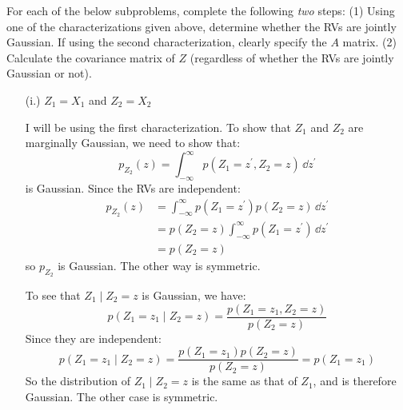 \documentclass{article}
\begin{document}
\begin{itemize}
        For each of the below subproblems, complete the following \textit{two} steps: (1) Using one of the characterizations given above, determine whether the RVs are jointly Gaussian. If using the second characterization, clearly specify the $A$ matrix. (2) Calculate the covariance matrix of $Z$ (regardless of whether the RVs are jointly Gaussian or not).
            \begin{itemize}
                \item [(i.)] $Z_{1} = X_{1}$ and $Z_{2} = X_{2}$
                    \begin{answer}
                        I will be using the first characterization. To show that $Z_{1}$ and $Z_{2}$ are marginally Gaussian, we need to show that:
                            \begin{equation*}
                                p_{Z_{2}}(z) = \int_{-\infty}^{\infty} p(Z_{1} = z^{\prime}, Z_{2} = z) \, \dd{z^{\prime}}
                            \end{equation*}
                        is Gaussian. Since the RVs are independent:
                            \begin{align*}
                                p_{Z_{2}}(z) &= \int_{-\infty}^{\infty} p(Z_{1} = z^{\prime})p(Z_{2} = z) \, \dd{z^{\prime}}  \\
                                             &= p(Z_{2} = z) \int_{-\infty}^{\infty} p(Z_{1} = z^{\prime}) \, \dd{z^{\prime}} \\
                                             &= p(Z_{2} = z)                                                                    
                            \end{align*}
                        so $p_{Z_{2}}$ is Gaussian. The other way is symmetric.

                        To see that $Z_{1} \mid Z_{2} = z$ is Gaussian, we have:
                            \begin{equation*}
                                p(Z_{1} = z_{1} \mid Z_{2} = z) = \dfrac{p(Z_{1} = z_{1}, Z_{2} = z)}{p(Z_{2} = z)}
                            \end{equation*}
                        Since they are independent:
                            \begin{equation*}
                                p(Z_{1} = z_{1} \mid Z_{2} = z) = \dfrac{p(Z_{1} = z_{1})p(Z_{2} = z)}{p(Z_{2} = z)} = p(Z_{1} = z_{1})
                            \end{equation*}
                        So the distribution of $Z_{1} \mid Z_{2} = z$ is the same as that of $Z_{1}$, and is therefore Gaussian. The other case is symmetric.


\end{answer}
\end{itemize}
\end{itemize}
\end{document}

